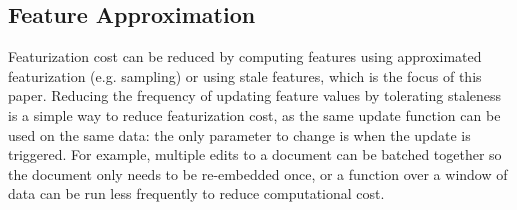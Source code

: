 










\subsection{Feature Approximation} 
\label{sec:approximation}



Featurization cost can be reduced by computing features using approximated featurization (e.g. sampling) or using stale features, which is the focus of this paper. Reducing the frequency of updating feature values by tolerating staleness is a simple way to reduce featurization cost, as the same update function can be used on the same data: the only parameter to change is when the update is triggered. For example, multiple edits to a document can be batched together so the document only needs to be re-embedded once, or a function over a window of data can be run less frequently to reduce computational cost. 


